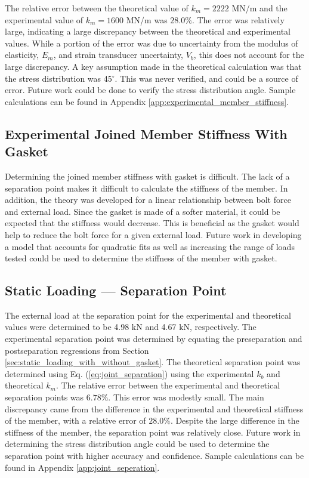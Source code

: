 The relative error between the theoretical value of $k_m = 2222$ MN/m and the experimental value of $k_m = 1600$ MN/m was $28.0\%$. The error was relatively large, indicating a large discrepancy between the theoretical and experimental values. While a portion of the error was due to uncertainty from the modulus of elasticity, $E_m$, and strain transducer uncertainty, $V_b$, this does not account for the large discrepancy. A key assumption made in the theoretical calculation was that the stress distribution was 45$^\circ$. This was never verified, and could be a source of error. Future work could be done to verify the stress distribution angle. Sample calculations can be found in Appendix \ref{app:experimental_member_stiffness}.

\subsection{Experimental Joined Member Stiffness With Gasket}
Determining the joined member stiffness with gasket is difficult. The lack of a separation point makes it difficult to calculate the stiffness of the member. In addition, the theory was developed for a linear relationship between bolt force and external load. Since the gasket is made of a softer material, it could be expected that the stiffness would decrease. This is beneficial as the gasket would help to reduce the bolt force for a given external load. Future work in developing a model that accounts for quadratic fits as well as increasing the range of loads tested could be used to determine the stiffness of the member with gasket.

\subsection{Static Loading --- Separation Point}
The external load at the separation point for the experimental and theoretical values were determined to be 4.98 kN and 4.67 kN, respectively. The experimental separation point was determined by equating the preseparation and postseparation regressions from Section \ref{sec:static_loading_with_without_gasket}. The theoretical separation point was determined using Eq. (\ref{eq:joint_separation}) using the experimental $k_b$ and theoretical $k_m$. The relative error between the experimental and theoretical separation points was $6.78\%$. This error was modestly small. The main discrepancy came from the difference in the experimental and theoretical stiffness of the member, with a relative error of $28.0\%$. Despite the large difference in the stiffness of the member, the separation point was relatively close. Future work in determining the stress distribution angle could be used to determine the separation point with higher accuracy and confidence. Sample calculations can be found in Appendix \ref{app:joint_seperation}.

